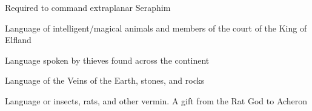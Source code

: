 {

Required to command extraplanar Seraphim


Language of intelligent/magical animals and members of the court of the King of Elfland


Language spoken by thieves found across the continent


Language of the Veins of the Earth, stones, and rocks


Language or insects, rats, and other vermin. A gift from the Rat God to Acheron


} %
